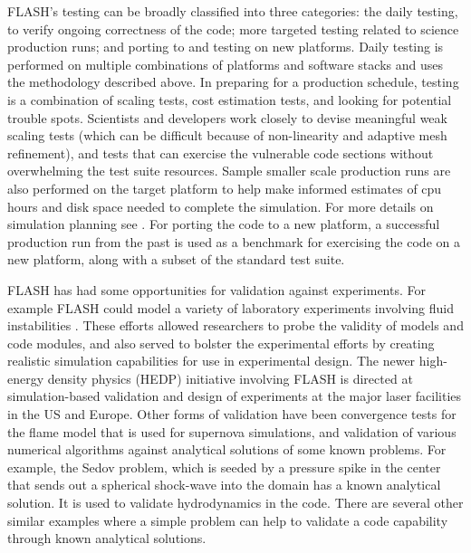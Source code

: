 FLASH's testing can be broadly classified into
three categories: the daily testing, to verify
ongoing correctness of the code; more targeted testing  related to
science production runs; and porting to and testing on new
platforms. Daily testing is performed on multiple combinations of
platforms and software stacks and uses the methodology described above. In preparing for a  production
schedule, testing is a combination of 
scaling tests, cost estimation tests, and looking for potential
trouble spots. Scientists and developers work closely to devise
meaningful weak scaling tests (which can be difficult because of
non-linearity and adaptive mesh refinement), and tests that can 
exercise the vulnerable code sections without overwhelming the test
suite resources. Sample smaller scale production runs are also
performed on the target platform to help make informed estimates of cpu
hours and disk space needed to complete the simulation. For more
details on simulation planning see \cite{Dubey2013}. For porting the
code to a new platform, a successful production run from the past is used as a
benchmark for exercising the code on a new platform, along with 
a subset of the standard test suite.

FLASH has had some opportunities for validation against
experiments. For example FLASH could model a variety of laboratory
experiments involving fluid instabilities
\cite{Dimonte2004,Kane2001}. These efforts allowed researchers to
probe the validity of models and code modules, and also served to
bolster the experimental efforts by creating realistic simulation
capabilities for use in experimental design. The newer high-energy
density physics (HEDP) initiative involving FLASH  
is directed at simulation-based validation and design of
experiments at the major laser facilities in the US and
Europe. Other forms of validation have been convergence tests for the
flame model that is used for supernova simulations, and validation of
various numerical algorithms against analytical solutions of some
known problems. For example, the Sedov \cite{sedov} problem, which is
seeded by a pressure spike in the center that sends out a spherical
shock-wave into the domain has a known analytical solution. It is used
to validate hydrodynamics in the code. There are several other similar
examples where a simple problem can help to validate a code capability
through known analytical solutions. 


